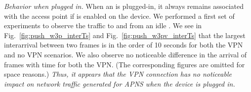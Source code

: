 
\emph{Behavior when plugged in.} When an \iphone{} is plugged-in, it always remains associated with the
\wifi{} access point if \wifi{} is enabled on the device. We performed
a first set of experiments to observe the traffic to and from an idle
\iphone{}. We see in Fig.~\ref{fig:push_w3p_interTs} and
Fig.~\ref{fig:push_w3pv_interTs} that the largest interarrival between
two frames is in the order of 10 seconds for both the VPN and no VPN
scenarios. We also observe no noticeable difference in the arrival of
frames with time for both the VPN. (The corresponding figures are 
omitted for space reasons.)
\emph{Thus, it 
appears that the VPN connection has no noticeable impact on 
network traffic generated for APNS when the device is plugged in.}



